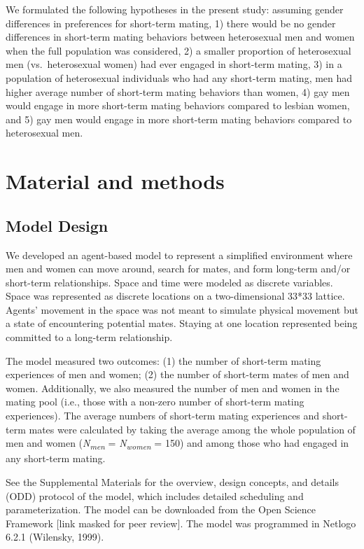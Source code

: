 \documentclass[
  11pt,
]{article}
\begin{document}
We formulated the following hypotheses in the present study: assuming
gender differences in preferences for short-term mating, 1) there would
be no gender differences in short-term mating behaviors between
heterosexual men and women when the full population was considered, 2) a
smaller proportion of heterosexual men (vs.~heterosexual women) had ever
engaged in short-term mating, 3) in a population of heterosexual
individuals who had any short-term mating, men had higher average number
of short-term mating behaviors than women, 4) gay men would engage in
more short-term mating behaviors compared to lesbian women, and 5) gay
men would engage in more short-term mating behaviors compared to
heterosexual men.

\hypertarget{material-and-methods}{%
\section{Material and methods}\label{material-and-methods}}

\hypertarget{model-design}{%
\subsection{Model Design}\label{model-design}}

We developed an agent-based model to represent a simplified environment
where men and women can move around, search for mates, and form
long-term and/or short-term relationships. Space and time were modeled
as discrete variables. Space was represented as discrete locations on a
two-dimensional 33*33 lattice. Agents' movement in the space was not
meant to simulate physical movement but a state of encountering
potential mates. Staying at one location represented being committed to
a long-term relationship.

The model measured two outcomes: (1) the number of short-term mating
experiences of men and women; (2) the number of short-term mates of men
and women. Additionally, we also measured the number of men and women in
the mating pool (i.e., those with a non-zero number of short-term mating
experiences). The average numbers of short-term mating experiences and
short-term mates were calculated by taking the average among the whole
population of men and women (\emph{N\textsubscript{men}} =
\emph{N\textsubscript{women}} = 150) and among those who had engaged in
any short-term mating.

See the Supplemental Materials for the overview, design concepts, and
details (ODD) protocol of the model, which includes detailed scheduling
and parameterization. The model can be downloaded from the Open Science
Framework {[}link masked for peer review{]}. The model was programmed in
Netlogo 6.2.1 (Wilensky, 1999).
\end{document}
